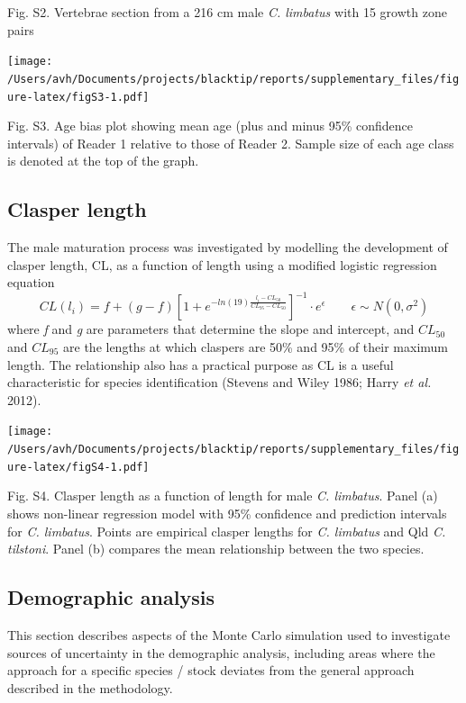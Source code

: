 \documentclass[]{article}
\begin{document}
Fig. S2. Vertebrae section from a 216 cm male \emph{C. limbatus} with 15
growth zone pairs

\newpage

\texttt{[image: /Users/avh/Documents/projects/blacktip/reports/supplementary\_files/figure-latex/figS3-1.pdf]}

Fig. S3. Age bias plot showing mean age (plus and minus 95\% confidence
intervals) of Reader 1 relative to those of Reader 2. Sample size of
each age class is denoted at the top of the graph.

\newpage

\hypertarget{clasper-length}{%
\subsection{Clasper length}\label{clasper-length}}

The male maturation process was investigated by modelling the
development of clasper length, CL, as a function of length using a
modified logistic regression equation
\[ CL(l_i) = f + (g-f)[1+e^{-ln(19)\frac{l_i - CL_{50}}{CL_{95}-CL_{50}}}]^{-1}\cdot e^{\epsilon} \quad \quad \epsilon \sim N(0,\sigma^2)\]
where \emph{f} and \emph{g} are parameters that determine the slope and
intercept, and \(CL_{50}\) and \(CL_{95}\) are the lengths at which
claspers are 50\% and 95\% of their maximum length. The relationship
also has a practical purpose as CL is a useful characteristic for
species identification (Stevens and Wiley 1986; Harry \emph{et al.}
2012).

\texttt{[image: /Users/avh/Documents/projects/blacktip/reports/supplementary\_files/figure-latex/figS4-1.pdf]}

Fig. S4. Clasper length as a function of length for male \emph{C.
limbatus}. Panel (a) shows non-linear regression model with 95\%
confidence and prediction intervals for \emph{C. limbatus}. Points are
empirical clasper lengths for \emph{C. limbatus} and Qld \emph{C.
tilstoni}. Panel (b) compares the mean relationship between the two
species.

\hypertarget{demographic-analysis}{%
\subsection{Demographic analysis}\label{demographic-analysis}}

This section describes aspects of the Monte Carlo simulation used to
investigate sources of uncertainty in the demographic analysis,
including areas where the approach for a specific species / stock
deviates from the general approach described in the methodology.
\end{document}
